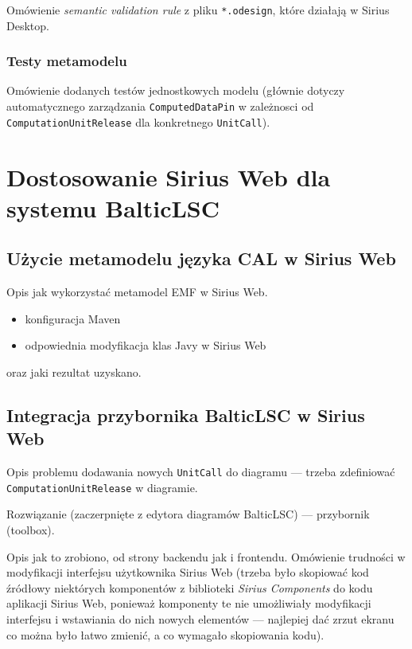 Omówienie \textit{semantic validation rule} z pliku \texttt{*.odesign}, które
działają w Sirius Desktop.

\subsection{Testy metamodelu}

Omówienie dodanych testów jednostkowych modelu (głównie dotyczy automatycznego
zarządzania \texttt{ComputedDataPin} w zależnosci od
\texttt{ComputationUnitRelease} dla konkretnego \texttt{UnitCall}).

\chapter{Dostosowanie Sirius Web dla systemu BalticLSC}

\section{Użycie metamodelu języka CAL w Sirius Web}

Opis jak wykorzystać metamodel EMF w Sirius Web.

\begin{itemize}
	\item konfiguracja Maven
	\item odpowiednia modyfikacja klas Javy w Sirius Web
\end{itemize}

\noindent oraz jaki rezultat uzyskano.

\section{Integracja przybornika BalticLSC w Sirius Web}

Opis problemu dodawania nowych \texttt{UnitCall} do diagramu --- trzeba
zdefiniować \texttt{ComputationUnitRelease} w diagramie.

Rozwiązanie (zaczerpnięte z edytora diagramów BalticLSC) --- przybornik
(toolbox).

Opis jak to zrobiono, od strony backendu jak i frontendu. Omówienie trudności w
modyfikacji interfejsu użytkownika Sirius Web (trzeba było skopiować kod
źródłowy niektórych komponentów z biblioteki \textit{Sirius Components} do kodu
aplikacji Sirius Web, ponieważ komponenty te nie umożliwiały modyfikacji
interfejsu i wstawiania do nich nowych elementów --- najlepiej dać zrzut ekranu
co można było łatwo zmienić, a co wymagało skopiowania kodu).

